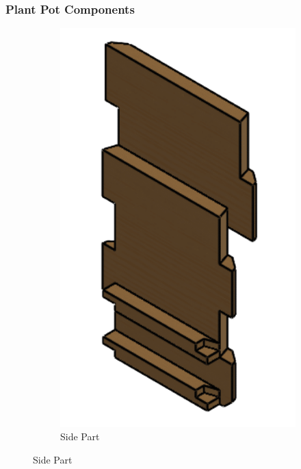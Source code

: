 \documentclass[12pt]{extarticle} %
\begin{document}
\subsubsection{Plant Pot Components}
\begin{figure}[!ht]
     \centering
     \begin{subfigure}[b]{0.2\textwidth}
         \centering
         \includegraphics[width=\textwidth]{images/screenshots/ind_pot_comp/Pentagonal side-1.png}
         \caption{Side Part}
         \label{fig:pent_pot_side_part}
     \end{subfigure}

\end{figure}
\end{document}
